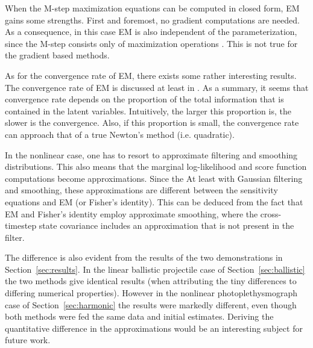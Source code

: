 When the M-step maximization equations
can be computed in closed form, EM gains some strengths.
First and foremost, no gradient computations are needed.
As a consequence, in this case EM is also independent
of the parameterization, since the M-step consists only of
maximization operations \parencite{Cappe2005}. This is not true
for the gradient based methods.

As for the convergence rate of EM, there exists some rather interesting results.
The convergence rate of EM is discussed at least in 
\textcite{Salakhutdinov2003,Salakhutdinov2004,Petersen2005a,Gibson2005}. As a summary,
it seems that convergence rate depends on the proportion 
of the total information that is contained in the latent variables. Intuitively,
the larger this proportion is, the slower is the convergence. Also, if this proportion
is small, the convergence rate can approach that of a true Newton's method (i.e. quadratic).

In the nonlinear case, one has to resort to approximate filtering and smoothing distributions.
This also means that the marginal log-likelihood and score function computations 
become approximations. Since the 
At least with Gaussian filtering and smoothing, these approximations are different between
the sensitivity equations and EM (or Fisher's identity). This can be deduced from the fact
that EM and Fisher's identity employ approximate smoothing, where the cross-timestep
state covariance includes an approximation that is not present in the filter. 

The difference is also evident from
the results of the two demonstrations in Section~\ref{sec:results}. In the linear ballistic projectile
case of Section~\ref{sec:ballistic} the two methods give identical results 
(when attributing the tiny differences
to differing numerical properties). However in the nonlinear photoplethysmograph case 
of Section~\ref{sec:harmonic} the results
were markedly different, even though both methods were fed the same data and initial estimates.
Deriving the quantitative difference in the approximations would be an interesting subject
for future work.


